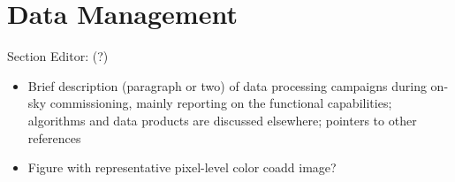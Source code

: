 \section{Data Management}
\label{sec:data_management}

Section Editor: (?)

\begin{itemize}
    \item Brief description (paragraph or two) of data processing campaigns during on-sky commissioning, mainly reporting on the functional capabilities; algorithms and data products are discussed elsewhere; pointers to other references
    \item Figure with representative pixel-level color coadd image?
\end{itemize}
